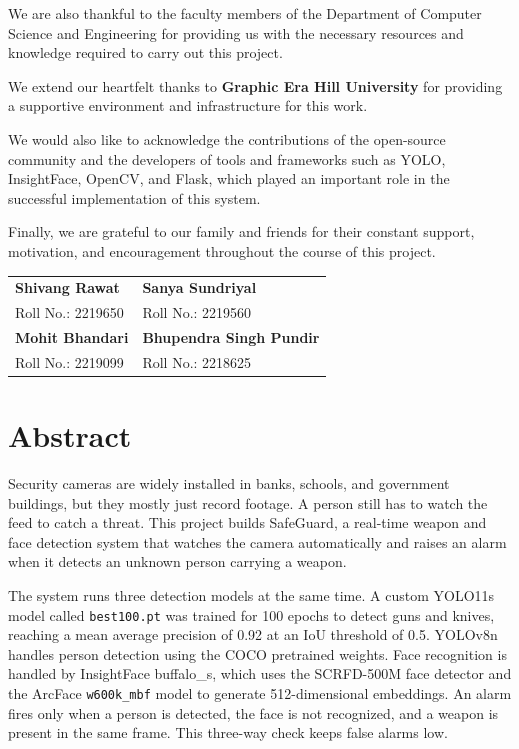 \documentclass[12pt,a4paper]{report}
\begin{document}
We are also thankful to the faculty members of the Department of Computer Science and Engineering for providing us with the necessary resources and knowledge required to carry out this project.

We extend our heartfelt thanks to \textbf{Graphic Era Hill University} for providing a supportive environment and infrastructure for this work.

We would also like to acknowledge the contributions of the open-source community and the developers of tools and frameworks such as YOLO, InsightFace, OpenCV, and Flask, which played an important role in the successful implementation of this system.

Finally, we are grateful to our family and friends for their constant support, motivation, and encouragement throughout the course of this project.

\vspace{2cm}

\noindent
\begin{tabular}{p{6cm} p{6cm}}
\textbf{Shivang Rawat} & \textbf{Sanya Sundriyal} \\
Roll No.: 2219650 & Roll No.: 2219560 \\[1.5cm]

\textbf{Mohit Bhandari} & \textbf{Bhupendra Singh Pundir} \\
Roll No.: 2219099 & Roll No.: 2218625 \\
\end{tabular}

\newpage
\chapter*{Abstract}

Security cameras are widely installed in banks, schools, and government buildings, but they mostly just record footage. A person still has to watch the feed to catch a threat. This project builds SafeGuard, a real-time weapon and face detection system that watches the camera automatically and raises an alarm when it detects an unknown person carrying a weapon.

The system runs three detection models at the same time. A custom YOLO11s model called \texttt{best100.pt} was trained for 100 epochs to detect guns and knives, reaching a mean average precision of 0.92 at an IoU threshold of 0.5. YOLOv8n handles person detection using the COCO pretrained weights. Face recognition is handled by InsightFace buffalo\_s, which uses the SCRFD-500M face detector and the ArcFace \texttt{w600k\_mbf} model to generate 512-dimensional embeddings. An alarm fires only when a person is detected, the face is not recognized, and a weapon is present in the same frame. This three-way check keeps false alarms low.
\end{document}
